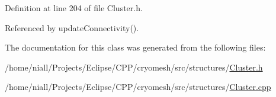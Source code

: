 \-Definition at line 204 of file \-Cluster.\-h.



\-Referenced by update\-Connectivity().



\-The documentation for this class was generated from the following files\-:\begin{DoxyCompactItemize}
\item 
/home/niall/\-Projects/\-Eclipse/\-C\-P\-P/cryomesh/src/structures/\hyperlink{Cluster_8h}{\-Cluster.\-h}\item 
/home/niall/\-Projects/\-Eclipse/\-C\-P\-P/cryomesh/src/structures/\hyperlink{Cluster_8cpp}{\-Cluster.\-cpp}\end{DoxyCompactItemize}
